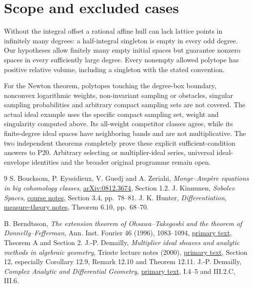 \documentclass[11pt]{article}
\begin{document}
\section{Scope and excluded cases}
Without the integral offset a rational affine hull can lack lattice
points in infinitely many degrees: a half-integral singleton is empty
in every odd degree. Our hypotheses allow finitely many empty initial
spaces but guarantee nonzero spaces in every sufficiently large degree.
Every nonempty allowed polytope has positive relative volume, including
a singleton with the stated convention.

For the Newton theorem, polytopes touching the degree-box boundary,
nonconvex logarithmic
weights, non-invariant sampling or obstacles, singular sampling
probabilities and arbitrary compact sampling sets are not covered.
The actual ideal example uses the specific compact sampling set, weight
and singularity computed above. Its all-weight competitor classes agree,
while its finite-degree ideal spaces have neighboring bands and are not
multiplicative. The two independent theorems completely prove these
explicit sufficient-condition answers to P20. Arbitrary selecting or
multiplier-ideal series, universal ideal-envelope identities and the
broader original programme remain open.
\begin{thebibliography}{9}
 S. Boucksom, P. Eyssidieux, V. Guedj and A. Zeriahi,
\emph{Monge--Amp\`ere equations in big cohomology classes},
\href{https://arxiv.org/abs/0812.3674}{arXiv:0812.3674}, Section 1.2.
 J. Kinnunen, \emph{Sobolev Spaces},
\href{https://math.aalto.fi/~jkkinnun/files/sobolev_spaces.pdf}{course notes},
Section 3.4, pp.~78--81.
 J. K. Hunter, \emph{Differentiation},
\href{https://www.math.ucdavis.edu/~hunter/m206/ch5_measure_notes.pdf}{measure-theory notes},
Theorem 6.10, pp.~68--70.

 B. Berndtsson,
\emph{The extension theorem of Ohsawa--Takegoshi and the theorem of
Donnelly--Fefferman}, Ann. Inst. Fourier 46 (1996), 1083--1094,
\href{https://www.numdam.org/item/10.5802/aif.1541.pdf}{primary text},
Theorem A and Section 2.
 J.-P. Demailly,
\emph{Multiplier ideal sheaves and analytic methods in algebraic geometry},
Trieste lecture notes (2000),
\href{https://www-fourier.univ-grenoble-alpes.fr/~demailly/manuscripts/trieste.pdf}{primary text},
Section 12, especially Corollary 12.9, Remark 12.10 and Theorem 12.11.
 J.-P. Demailly,
\emph{Complex Analytic and Differential Geometry},
\href{https://people.math.harvard.edu/~demarco/Math274/Demailly_ComplexAnalyticDiffGeom.pdf}{primary text},
I.4--5 and III.2.C, III.6.
\end{thebibliography}
\end{document}
